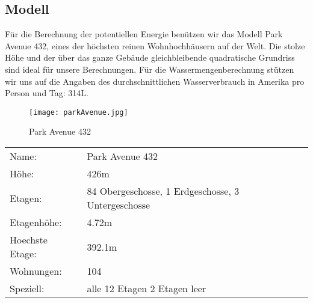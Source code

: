 \subsection{Modell} \label{subsec:modell}

Für die Berechnung der potentiellen Energie benützen wir das Modell Park Avenue 432, eines der höchsten reinen Wohnhochhäusern auf der Welt. Die stolze Höhe und der über das ganze Gebäude gleichbleibende quadratische Grundriss sind ideal für unsere Berechnungen. Für die Wassermengenberechnung stützen wir uns auf die Angaben des durchschnittlichen Wasserverbrauch in Amerika pro Person und Tag: 314\si{L}. \cite{waterUsAmerica}

\begin{figure} [H]
	\centering
	\texttt{[image: parkAvenue.jpg]}
	\caption{Park Avenue 432 \cite{432_Park_Avenue}}
	\label{fig:Park_Avenue_432}
\end{figure}

\begin{table}[H]
\centering
\begin{tabular}{ll}
Name:				&Park Avenue 432\\
Höhe: 				&426m\\          
Etagen:				&84 Obergeschosse, 1 Erdgeschosse, 3 Untergeschosse\\
Etagenhöhe:			&4.72m\\
Hoechste Etage:		&392.1m\\
Wohnungen:			&104\\
Speziell:			&alle 12 Etagen 2 Etagen leer\\           
\end{tabular}
\end{table}

\newpage
